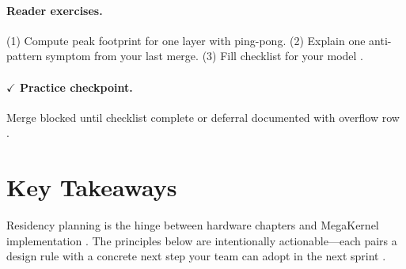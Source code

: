 \paragraph{Reader exercises.}
(1) Compute peak footprint for one layer with ping-pong. (2) Explain one anti-pattern symptom from your last merge. (3) Fill checklist for your model \citep{yirage2026,dao2022flashattention,amd2024xdna,nvidia2022hopper,taxbreak2026,memoryfloor2026}.

\paragraph{$\checkmark$ Practice checkpoint.}
Merge blocked until checklist complete or deferral documented with overflow row \citep{yirage2026,chen2020compilerbasedhardw}.

\section{Key Takeaways}
\label{sec:ch06_key_takeaways}

Residency planning is the hinge between hardware chapters and MegaKernel implementation \citep{patel2025llminference,yirage2026,chen2020compilerbasedhardw}.
The principles below are intentionally actionable---each pairs a design rule with a concrete next step your team can adopt in the next sprint \citep{taxbreak2026,memoryfloor2026}.

